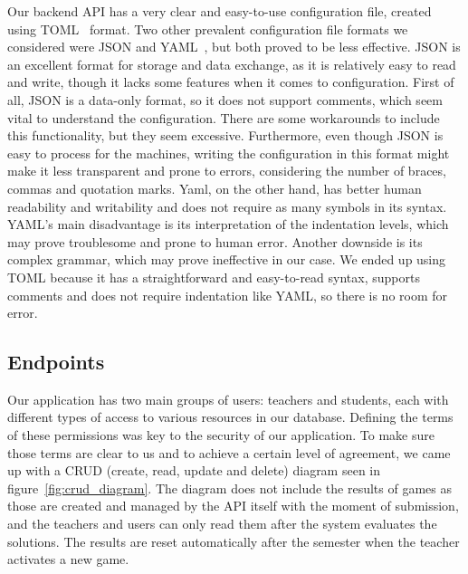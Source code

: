 Our backend API has a very clear and easy-to-use configuration file, created using TOML~\cite{toml} format. Two other prevalent configuration file formats we considered were JSON and YAML~\cite{yaml}, but both proved to be less effective. JSON is an excellent format for storage and data exchange, as it is relatively easy to read and write, though it lacks some features when it comes to configuration. First of all, JSON is a data-only format, so it does not support comments, which seem vital to understand the configuration. There are some workarounds to include this functionality, but they seem excessive. Furthermore, even though JSON is easy to process for the machines, writing the configuration in this format might make it less transparent and prone to errors, considering the number of braces, commas and quotation marks. Yaml, on the other hand, has better human readability and writability and does not require as many symbols in its syntax. YAML's main disadvantage is its interpretation of the indentation levels, which may prove troublesome and prone to human error. Another downside is its complex grammar, which may prove ineffective in our case. We ended up using TOML because it has a straightforward and easy-to-read syntax, supports comments and does not require indentation like YAML, so there is no room for error.


\subsection{Endpoints}


Our application has two main groups of users: teachers and students, each with different types of access to various resources in our database. Defining the terms of these permissions was key to the security of our application. To make sure those terms are clear to us and to achieve a certain level of agreement, we came up with a CRUD (create, read, update and delete) diagram seen in figure~\ref{fig:crud_diagram}. The diagram does not include the results of games as those are created and managed by the API itself with the moment of submission, and the teachers and users can only read them after the system evaluates the solutions. The results are reset automatically after the semester when the teacher activates a new game.

